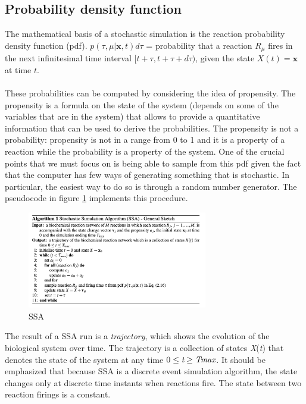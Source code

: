   \subsection{Probability density function}
  The mathematical basis of a stochastic simulation is the reaction probability density function (pdf).
  $p(\tau, \mu |\mathbf{x}, t)d\tau$ = probability that a reaction $R_\mu$ fires in the next infinitesimal time interval $[t+\tau,t+\tau+d\tau)$, given the state $X(t) = \mathbf{x}$ at time $t$.
  \\
  \\
  \noindent
  These probabilities can be computed by considering the idea of propensity.
  The propensity is a formula on the state of the system (depends on some of the variables that are in the system) that allows to provide a quantitative information that can be used to derive the probabilities.
  The propensity is not a probability: propensity is not in a range from 0 to 1 and it is a property of a reaction while the probability is a property of the system.
  One of the crucial points that we must focus on is being able to sample from this pdf given the fact that the computer has few ways of generating something that is stochastic.
  In particular, the easiest way to do so is through a random number generator.
  The pseudocode in figure \ref{fig:SSA} implements this procedure.

  \begin{figure}
    \centering
    \includegraphics[width=0.7\textwidth]{SSA_algo.png}
    \caption{SSA}
    \label{fig:SSA}
  \end{figure}


\noindent
  The result of a SSA run is a \emph{trajectory}, which shows the evolution of the biological system over time.
  The trajectory is a collection of states \emph{X}(\emph{t}) that denotes the state of the system at any time $0 \leq \emph{t}\geq \emph{Tmax}$.
  It should be emphasized that because SSA is a discrete event simulation algorithm, the state changes only at discrete time instants when reactions fire.
  The state between two reaction firings is a constant.
